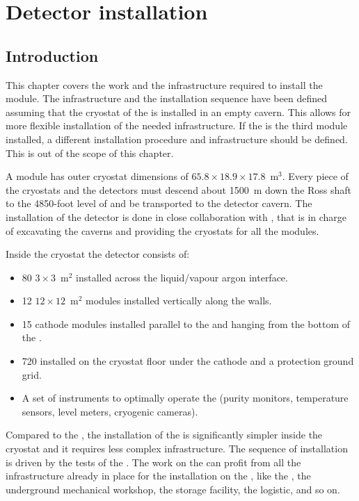 \chapter{Detector installation}
\label{ch:dp-installation}

\section{Introduction}
\label{ch:dp-install-intro}

This chapter covers the work and the infrastructure required to install the    module.
The infrastructure and the installation sequence have been defined assuming that the cryostat of the  is installed in an empty cavern.
This allows for more flexible installation of the needed infrastructure.
If the  is the third module installed, a different installation procedure and infrastructure should be defined.
This is out of the scope of this chapter.

A   module has outer cryostat dimensions of $65.8 \times 18.9 \times 17.8$~m$^3$.
Every piece of the cryostats and the detectors must descend about 1500~m down the Ross shaft to the 4850-foot level of  and be transported to the detector cavern.
The installation of the detector is done in close collaboration with , that is in charge of  excavating the caverns and providing the cryostats for all the  modules.

Inside the cryostat the  detector consists of:
\begin{itemize}
\item 80 $3 \times 3$~m$^2$  installed across the liquid/vapour argon interface.
\item  12 $12 \times 12$~m$^2$  modules installed vertically along the walls.
\item  15 cathode modules  installed parallel to the  and hanging from the bottom of the .
\item  720  installed on the cryostat floor under the cathode and a protection ground grid.
\item  A set of instruments to optimally operate the  (purity monitors, temperature sensors, level meters, cryogenic cameras).
\end{itemize}

Compared to the , the installation of the  is significantly simpler inside the cryostat and it requires less complex infrastructure.
The sequence of installation is driven by the tests of the .
The work on the  can profit from all the infrastructure already in place for the installation on the , like the , the underground mechanical workshop, the storage facility, the logistic, and so on.

